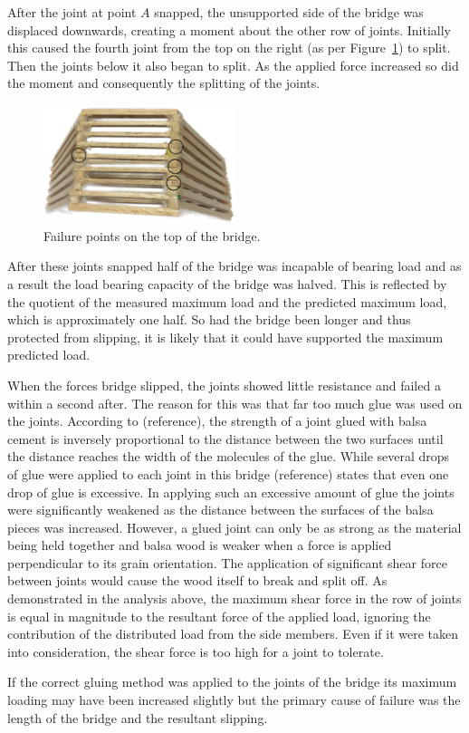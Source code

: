 \documentclass[12pt]{article}
\begin{document}
After the joint at point $A$ snapped, the unsupported side of the bridge was displaced downwards, creating a moment about the other row of joints. Initially this caused the fourth joint from the top on the right (as per Figure~\ref{failtop}) to split. Then the joints below it also began to split. As the applied force increased so did the moment and consequently the splitting of the joints.
		\begin{figure}[h!]
			\centering
			\includegraphics[width=0.5\textwidth]{failtop}
			\caption{Failure points on the top of the bridge.}
			\label{failtop}
		\end{figure}

After these joints snapped half of the bridge was incapable of bearing load and as a result the load bearing capacity of the bridge was halved. This is reflected by the quotient of the measured maximum load and the predicted maximum load, which is approximately one half. So had the bridge been longer and thus protected from slipping, it is likely that it could have supported the maximum predicted load.

When the forces bridge slipped, the joints showed little resistance and failed a within a second after. The reason for this was that far too much glue was used on the joints. According to (reference), the strength of a joint glued with balsa cement is inversely proportional to the distance between the two surfaces until the distance reaches the width of the molecules of the glue. While several drops of glue were applied to each joint in this bridge (reference) states that even one drop of glue is excessive. In applying such an excessive amount of glue the joints were significantly weakened as the distance between the surfaces of the balsa pieces was increased. However, a glued joint can only be as strong as the material being held together and balsa wood is weaker when a force is applied perpendicular to its grain orientation. The application of significant shear force between joints would cause the wood itself to break and split off. As demonstrated in the analysis above, the maximum shear force in the row of joints is equal in magnitude to the resultant force of the applied load, ignoring the contribution of the distributed load from the side members. Even if it were taken into consideration, the shear force is too high for a joint to tolerate.

If the correct gluing method was applied to the joints of the bridge its maximum loading may have been increased slightly but the primary cause of failure was the length of the bridge and the resultant slipping.

	
\end{document}
